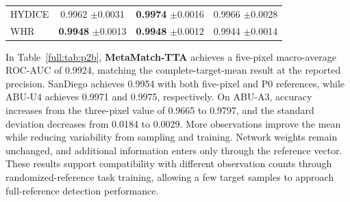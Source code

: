 \documentclass[a4paper,11pt]{article}
\newcommand{\method}{\textbf{MetaMatch-TTA}}
\begin{document}
\begin{table}[H]
\begin{lrbox}{\fulltablebox}
\begin{tabular}{lccc}
HYDICE & \shortstack{0.9962\\$\pm$0.0031} & \shortstack{\textbf{0.9974}\\$\pm$0.0016} & \shortstack{0.9966\\$\pm$0.0028} \\
WHR & \shortstack{\textbf{0.9948}\\$\pm$0.0013} & \shortstack{\textbf{0.9948}\\$\pm$0.0012} & \shortstack{0.9944\\$\pm$0.0014} \\
\bottomrule\end{tabular}\end{lrbox}\ifdim\wd\fulltablebox>\linewidth\resizebox{\linewidth}{!}{\usebox{\fulltablebox}}\else\usebox{\fulltablebox}\fi\end{table}

In Table~\ref{full:tab:p2b}, \method{} achieves a five-pixel macro-average ROC-AUC of 0.9924, matching the complete-target-mean result at the reported precision. SanDiego achieves 0.9954 with both five-pixel and P0 references, while ABU-U4 achieves 0.9971 and 0.9975, respectively. On ABU-A3, accuracy increases from the three-pixel value of 0.9665 to 0.9797, and the standard deviation decreases from 0.0184 to 0.0029. More observations improve the mean while reducing variability from sampling and training. Network weights remain unchanged, and additional information enters only through the reference vector. These results support compatibility with different observation counts through randomized-reference task training, allowing a few target samples to approach full-reference detection performance.
\end{document}
